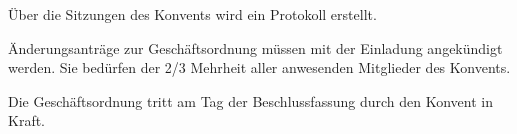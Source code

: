 \documentclass[a4paper, parskip=half, numbers=noenddot]{scrartcl}
\begin{document}
\begin{contract}
Über die Sitzungen des Konvents wird ein Protokoll erstellt.

Änderungsanträge zur Geschäftsordnung müssen mit der Einladung angekündigt werden. Sie bedürfen der 2/3 Mehrheit aller anwesenden Mitglieder des Konvents.

Die Geschäftsordnung tritt am Tag der Beschlussfassung durch den Konvent in Kraft.


\end{contract}
\end{document}
